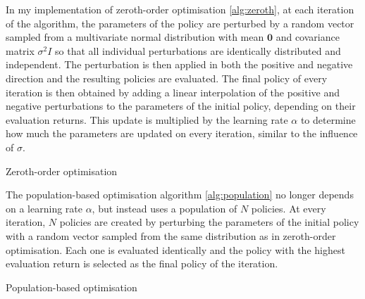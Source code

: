 \documentclass[10pt]{article}
\begin{document}
In my implementation of zeroth-order optimisation \ref{alg:zeroth}, at each iteration of
the algorithm, the parameters of the policy are perturbed by a random vector sampled from
a multivariate normal distribution with mean $\mathbf{0}$ and covariance matrix
$\sigma^2I$ so that all individual perturbations are identically distributed and
independent.
The perturbation is then applied in both the positive and negative direction and the
resulting policies are evaluated.
The final policy of every iteration is then obtained by adding a linear interpolation of
the positive and negative perturbations to the parameters of the initial policy,
depending on their evaluation returns.
This update is multiplied by the learning rate $\alpha$ to determine how much the
parameters are updated on every iteration, similar to the influence of $\sigma$.

\begin{algorithm}[h]
        

    \caption{Zeroth-order optimisation} \label{alg:zeroth}
\end{algorithm}

The population-based optimisation algorithm \ref{alg:population} no longer depends on a
learning rate $\alpha$, but instead uses a population of $N$ policies.
At every iteration, $N$ policies are created by perturbing the parameters of the initial
policy with a random vector sampled from the same distribution as in zeroth-order
optimisation.
Each one is evaluated identically and the policy with the highest evaluation return is
selected as the final policy of the iteration.

\begin{algorithm}[h] 
     
     
      \caption{Population-based optimisation} \label{alg:population}
\end{algorithm}
\end{document}
